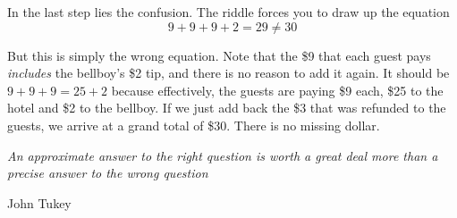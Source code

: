 In the last step lies the confusion. The riddle forces you to draw up the equation
\begin{equation*}
    9 + 9 + 9 + 2 = 29 \neq 30
\end{equation*}

But this is simply the wrong equation. Note that the \$9 that each guest pays \textit{includes} the bellboy’s \$2 tip, and there is no reason to add it again. It should be $9 + 9 + 9 = 25 + 2$ because effectively, the guests are paying \$9 each, \$25 to the hotel and \$2 to the bellboy. If we just add back the \$3 that was refunded to the guests, we arrive at a grand total of \$30. There is no missing dollar.

\vspace{5mm}

\textit{An approximate answer to the right question is worth a great deal more than a precise answer to the wrong question}
\begin{flushright}
       John Tukey
\end{flushright}
